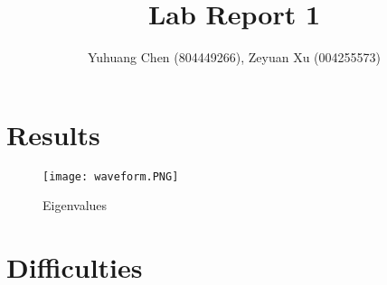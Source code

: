 \documentclass{article}
\title{Lab Report 1}
\author{Yuhuang Chen (804449266), Zeyuan Xu (004255573)}
\date{}
\begin{document}
  \maketitle%
  \thispagestyle{empty}

\section{Results}


\begin{figure}[h]
  \centering
  \texttt{[image: waveform.PNG]}
  \caption{Eigenvalues}
  \label{fig:Eigenvalues}
\end{figure}


\section{Difficulties}
\end{document}
